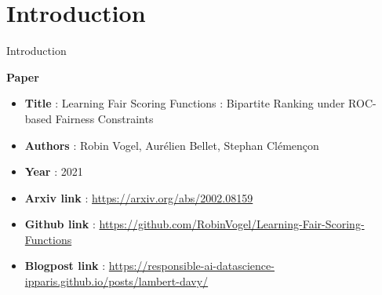 \section{Introduction}
\begin{frame}{Introduction}



\begin{block}{\textbf{Paper}}
    \begin{itemize}
        \item \textbf{Title} : Learning Fair Scoring Functions : Bipartite Ranking under ROC-based Fairness Constraints
        \item \textbf{Authors} : Robin Vogel, Aurélien Bellet, Stephan Clémençon
        \item \textbf{Year} : 2021 
        \item \textbf{Arxiv link} : \url{https://arxiv.org/abs/2002.08159}
        \item \textbf{Github link} : \url{https://github.com/RobinVogel/Learning-Fair-Scoring-Functions}
        \item \textbf{Blogpost link} : \url{https://responsible-ai-datascience-ipparis.github.io/posts/lambert-davy/}
    \end{itemize}
\end{block}
    
\end{frame}